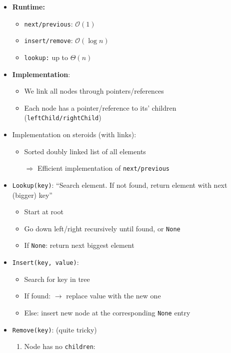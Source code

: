 \documentclass[12pt, a4paper]{scrartcl}
\newcommand{\bigO}{\mathcal{O}}
\renewcommand{\implies}{\Rightarrow}
\begin{document}
\begin{itemize}
\begin{figure}[htbp]
\begin{subfigure}[b]{.47\textwidth}
    \end{subfigure}
  \end{figure}
\item \textbf{Runtime:}
  \begin{itemize}
  \item \texttt{next/previous}: $\bigO(1)$
  \item \texttt{insert/remove}: $\bigO(\log n)$
  \item \texttt{lookup:} up to $\Theta(n)$
  \end{itemize}
\item \textbf{Implementation}:
  \begin{itemize}
  \item We link all nodes through pointers/references
  \item Each node has a pointer/reference to its' children (\texttt{leftChild/rightChild})
  \end{itemize}
\item Implementation on steroids (with links):
  \begin{itemize}
  \item Sorted doubly linked list of all elements
  \item[$\implies$] Efficient implementation of \texttt{next/previous}
  \end{itemize}
\item \texttt{Lookup(key)}: ``Search element. If not found, return element with next (bigger) key''
  \begin{itemize}
  \item Start at root
  \item Go down left/right recursively until found, or \texttt{None}
  \item If \texttt{None}: return next biggest element
  \end{itemize}
\item \texttt{Insert(key, value)}:
  \begin{itemize}
  \item Search for key in tree
  \item If found: $\rightarrow$ replace value with the new one
  \item Else: insert new node at the corresponding \texttt{None} entry
  \end{itemize}
\item \texttt{Remove(key)}: (quite tricky)
  \begin{enumerate}
  \item Node has no \texttt{children}:
    \begin{itemize}

\end{itemize}
\end{enumerate}
\end{itemize}
\end{document}
